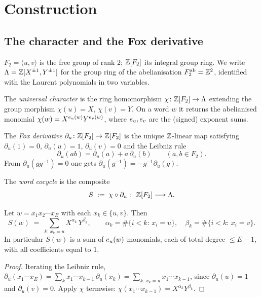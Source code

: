 \section{Construction}

\subsection*{The character and the Fox derivative}

\begin{nota}
$F_2=\langle u,v\rangle$ is the free group of rank $2$; $\mathbb{Z}[F_2]$ its integral group ring.
We write $\Lambda=\mathbb{Z}[X^{\pm1},Y^{\pm1}]$ for the group ring of the abelianisation
$F_2^{\mathrm{ab}}=\mathbb{Z}^2$, identified with the Laurent polynomials in two variables.
\end{nota}

\begin{defn}\label{def:chi}
The \emph{universal character} is the ring homomorphism $\chi\colon \mathbb{Z}[F_2]\to\Lambda$ extending
the group morphism $\chi(u)=X$, $\chi(v)=Y$. On a word $w$ it returns the abelianised
monomial $\chi(w)=X^{e_{u}(w)}Y^{e_{v}(w)}$, where $e_{u},e_{v}$ are the (signed) exponent sums.
\end{defn}

\begin{defn}\label{def:fox}
The \emph{Fox derivative} $\partial_u\colon \mathbb{Z}[F_2]\to\mathbb{Z}[F_2]$ is the unique $\mathbb{Z}$-linear map
satisfying $\partial_u(1)=0$, $\partial_u(u)=1$, $\partial_u(v)=0$ and the Leibniz rule
\[
   \partial_u(ab)=\partial_u(a)+a\,\partial_u(b)\qquad(a,b\in F_2).
\]
From $\partial_u(g g^{-1})=0$ one gets $\partial_u(g^{-1})=-g^{-1}\partial_u(g)$.
\end{defn}

\begin{defn}\label{def:S}
The \emph{word cocycle} is the composite
\[
   S\;:=\;\chi\circ\partial_u\;\colon\;\mathbb{Z}[F_2]\longrightarrow\Lambda .
\]
\end{defn}

\begin{prop}\label{prop:closed}
Let $w=x_1x_2\cdots x_E$ with each $x_k\in\{u,v\}$. Then
\[
   S(w)\;=\;\sum_{k:\,x_k=u} X^{\alpha_k}\,Y^{\beta_k},
   \qquad
   \alpha_k=\#\{i<k:\,x_i=u\},\quad \beta_k=\#\{i<k:\,x_i=v\}.
\]
In particular $S(w)$ is a sum of $e_{u}(w)$ monomials, each of total degree $\le E-1$, with
all coefficients equal to $1$.
\end{prop}

\begin{proof}
Iterating the Leibniz rule, $\partial_u(x_1\cdots x_E)=\sum_{k}x_1\cdots
x_{k-1}\,\partial_u(x_k)=\sum_{k:\,x_k=u}x_1\cdots x_{k-1}$, since $\partial_u(u)=1$ and
$\partial_u(v)=0$. Apply $\chi$ termwise: $\chi(x_1\cdots x_{k-1})=X^{\alpha_k}Y^{\beta_k}$.
\end{proof}

